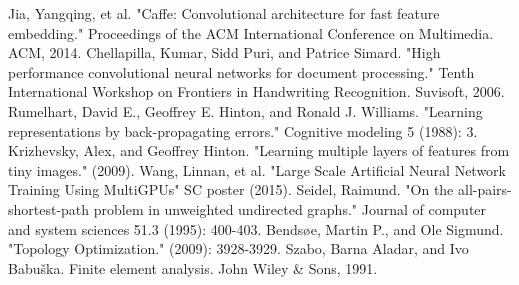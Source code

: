 \documentclass[conference]{IEEEtran}
\begin{document}
\begin{thebibliography}{100}
Jia, Yangqing, et al. "Caffe: Convolutional architecture for fast feature embedding." Proceedings of the ACM International Conference on Multimedia. ACM, 2014.
Chellapilla, Kumar, Sidd Puri, and Patrice Simard. "High performance convolutional neural networks for document processing." Tenth International Workshop on Frontiers in Handwriting Recognition. Suvisoft, 2006.
Rumelhart, David E., Geoffrey E. Hinton, and Ronald J. Williams. "Learning representations by back-propagating errors." Cognitive modeling 5 (1988): 3.
Krizhevsky, Alex, and Geoffrey Hinton. "Learning multiple layers of features from tiny images." (2009).
Wang, Linnan, et al. "Large Scale Artificial Neural Network Training Using MultiGPUs" SC poster (2015).
Seidel, Raimund. "On the all-pairs-shortest-path problem in unweighted undirected graphs." Journal of computer and system sciences 51.3 (1995): 400-403.
Bendsøe, Martin P., and Ole Sigmund. "Topology Optimization." (2009): 3928-3929.
Szabo, Barna Aladar, and Ivo Babuška. Finite element analysis. John Wiley \& Sons, 1991.

\end{thebibliography}
\end{document}
